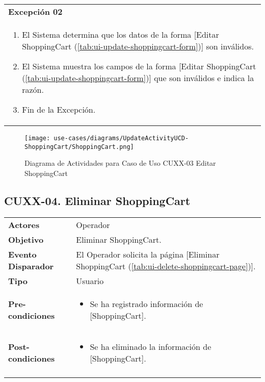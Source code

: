 	\begin{tabular}{ p{15.5cm} }
		\textbf{Excepci\'on 02} \\
		\begin{enumerate}
			\item El Sistema determina que los datos de la forma [Editar ShoppingCart (\ref{tab:ui-update-shoppingcart-form})] son inv\'alidos.
			\item El Sistema muestra los campos de la forma [Editar ShoppingCart (\ref{tab:ui-update-shoppingcart-form})] que son inv\'alidos e indica la raz\'on.
			\item Fin de la Excepci\'on.
		\end{enumerate}
	\end{tabular}
	
	\begin{figure}[H]
		\begin{center}
		 \label{tab:activity-update-ucd-entity-shoppingcart}
		 \texttt{[image: use-cases/diagrams/UpdateActivityUCD-ShoppingCart/ShoppingCart.png]}
		 \caption{Diagrama de Actividades para Caso de Uso CUXX-03 Editar ShoppingCart}
		\end{center}
	\end{figure}
	
	\clearpage
	\subsection{CUXX-04. Eliminar ShoppingCart} \label{sec:cu-delete-ShoppingCart}
	
	\begin{tabular}{ p{3.5cm} p{11.5cm} }
		\textbf{Actores} & Operador\\
		\textbf{Objetivo} & Eliminar ShoppingCart.\\
		\textbf{Evento Disparador} & El Operador solicita la p\'agina [Eliminar ShoppingCart (\ref{tab:ui-delete-shoppingcart-page})].\\
		\textbf{Tipo} & Usuario\\
		\textbf{Pre-condiciones} &
			\begin{minipage}[t]{0.6\textwidth}
			\begin{itemize}[noitemsep,nolistsep]
			\setlength{\itemindent}{-.5cm}
				\item Se ha registrado informaci\'on de [ShoppingCart].
			\end{itemize}
			\end{minipage} \\
		\textbf{Post-condiciones} &
			\begin{minipage}[t]{0.6\textwidth}
			\begin{itemize}[noitemsep,nolistsep]
			\setlength{\itemindent}{-.5cm}
				\item Se ha eliminado la informaci\'on de [ShoppingCart].
			\end{itemize}
			\end{minipage} \\
		\\
	\end{tabular}
	
